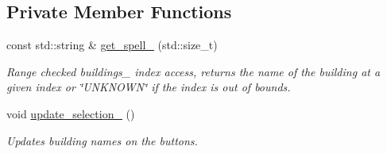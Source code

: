 \subsection*{Private Member Functions}
\begin{DoxyCompactItemize}
\item 
const std\+::string \& \hyperlink{class_spell_casting_window_a05004ce13e4b2417f2b6bab5098488be}{get\+\_\+spell\+\_\+} (std\+::size\+\_\+t)
\begin{DoxyCompactList}\small\item\em Range checked buildings\+\_\+ index access, returns the name of the building at a given index or \char`\"{}\+U\+N\+K\+N\+O\+W\+N\char`\"{} if the index is out of bounds. \end{DoxyCompactList}\item 
void \hyperlink{class_spell_casting_window_a2b90c5e701c4c00a3575935843d7c1c8}{update\+\_\+selection\+\_\+} ()
\begin{DoxyCompactList}\small\item\em Updates building names on the buttons. \end{DoxyCompactList}\end{DoxyCompactItemize}
